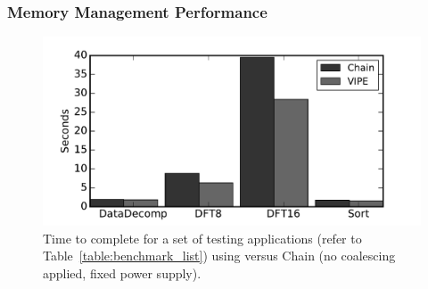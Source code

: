 
\subsubsection{Memory Management Performance}
\label{sec:results_memory_management}

\begin{figure}
	\centering
	\includegraphics[width=\columnwidth]{figures/chain_vipe}
	\caption{Time to complete for a set of testing applications (refer to Table~\ref{table:benchmark_list}) using \sys versus Chain (no coalescing applied, fixed power supply). }
	\label{fig:IPOSPerformance}
\end{figure}


